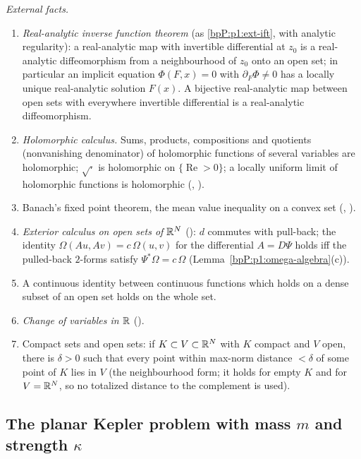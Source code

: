 \emph{External facts.}
\begin{enumerate}[label=(E\arabic*),ref=(E\arabic*)]
\item\label{bpP:p7:e-ift} \emph{Real-analytic inverse function theorem} (as \ref{bpP:p1:ext-ift}, with analytic regularity): a real-analytic map with invertible differential at $z_0$ is a real-analytic diffeomorphism from a neighbourhood of $z_0$ onto an open set; in particular an
implicit equation $\Phi(F,x)=0$ with $\partial_F\Phi\ne0$ has a locally unique real-analytic solution $F(x)$. A bijective real-analytic map between open sets with everywhere invertible differential is a real-analytic diffeomorphism.
\item\label{bpP:p7:e-hol} \emph{Holomorphic calculus.} Sums, products, compositions and quotients (nonvanishing denominator) of holomorphic functions of several variables are holomorphic; $\sqrt{\cdot}$ is holomorphic on $\{\operatorname{Re}>0\}$; a locally uniform limit of holomorphic functions is holomorphic (, ).
\item\label{bpP:p7:e-banach} Banach's fixed point theorem, the mean value inequality on a convex set (, ).
\item\label{bpP:p7:e-forms} \emph{Exterior calculus on open sets of $\mathbb{R}^N$} (): $d$ commutes with pull-back; the identity $\Omega(Au,Av)=c\,\Omega(u,v)$ for the differential $A=D\Psi$ holds iff the pulled-back $2$-forms satisfy $\Psi^*\Omega=c\,\Omega$ (Lemma~\ref{bpP:p1:omega-algebra}(c)).
\item\label{bpP:p7:e-dense} A continuous identity between continuous functions which holds on a dense subset of an open set holds on the whole set.
\item\label{bpP:p7:e-cov} \emph{Change of variables in $\mathbb{R}$} ().
\item\label{bpP:p7:e-comp} Compact sets and open sets: if $K\subset V\subset\mathbb{R}^N$ with $K$ compact and $V$ open, there is $\delta>0$ such that every point within max-norm distance $<\delta$ of some point of $K$ lies in $V$ (the neighbourhood form; it holds for empty $K$ and for $V=\mathbb{R}^N$, so no totalized distance to the complement is used).
\end{enumerate}

\subsection{The planar Kepler problem with mass $m$ and strength $\kappa$}\label{bpP:p7:sec-kepler}

